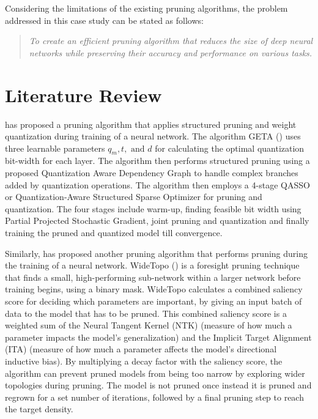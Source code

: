 \documentclass[11pt]{extreport}
\begin{document}
		\vspace{1em}
		Considering the limitations of the existing pruning algorithms, the problem addressed in this case study can be stated as follows:

		\begin{quote}
			\textit{To create an efficient pruning algorithm that reduces the size of deep neural networks while preserving their accuracy and performance on various tasks.}
		\end{quote}


	\newpage
	\chapter[Literature Review]{Literature Review}

	\cite{11092769} has proposed a pruning algorithm that applies structured pruning and weight quantization during training of a neural network. The algorithm GETA (\cite{11092769}) uses three learnable parameters \(q_m, t, \text { and } d\) for calculating the optimal quantization bit-width for each layer. The algorithm then performs structured pruning using a proposed Quantization Aware Dependency Graph to handle complex branches added by quantization operations. The algorithm then employs a 4-stage QASSO or Quantization-Aware Structured Sparse Optimizer for pruning and quantization. The four stages include warm-up, finding feasible bit width using Partial Projected Stochastic Gradient, joint pruning and quantization and finally training the pruned and quantized model till convergence.

	Similarly, \cite{DENG2026108136} has proposed another pruning algorithm that performs pruning during the training of a neural network. WideTopo (\cite{DENG2026108136}) is a foresight pruning technique that finds a small, high-performing sub-network within a larger network before training begins, using a binary mask. WideTopo calculates a combined saliency score for deciding which parameters are important, by giving an input batch of data to the model that has to be pruned. This combined saliency score is a weighted sum of the Neural Tangent Kernel (NTK) (measure of how much a parameter impacts the model's generalization) and the Implicit Target Alignment (ITA) (measure of how much a parameter affects the model's directional inductive bias). By multiplying a decay factor with the saliency score, the algorithm can prevent pruned models from being too narrow by exploring wider topologies during pruning. The model is not pruned once instead it is pruned and regrown for a set number of iterations, followed by a final pruning step to reach the target density.
\end{document}
